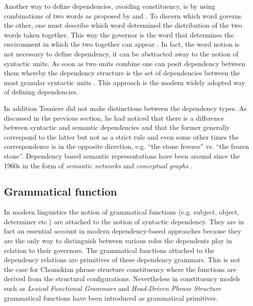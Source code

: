     Another way to define dependencies, avoiding constituency, is by using combinations of two words as proposed by \citet{Garde1977} and \citet{melcuk88}. To discern which word governs the other, one must describe which word determined the distribution of the two words taken together. This way the governor is the word that determines the environment in which the two together can appear \citep[lxi]{Tesniere2015}. In fact, the word notion is not necessary to define dependency, it can be abstracted away to the notion of syntactic units. As soon as two units combine one can posit dependency between them whereby the dependency structure is the set of dependencies between the most granular syntactic units \citep{gerdes2013defining}. This approach is the modern widely adopted way of defining dependencies.

    In addition Tesniere did not make distinctions between the dependency types. As discussed in the previous section, he had noticed that there is a difference between syntactic and semantic dependencies and that the former generally correspond to the latter but not as a strict rule and even some other times the correspondence is in the opposite direction, e.g. ``the stone freezes'' vs. ``the frozen stone''. Dependency based semantic representations have been around since the 1960s in the form of \textit{semantic networks} \citep{ZolkovskijMelcuk67,melcuk88} and \textit{conceptual graphs} \citep{schank1969, Sowa1976}.

\subsection{Grammatical function} 
    In modern linguistics the notion of grammatical functions (e.g. subject, object, determiner etc.) are attached to the notion of syntactic dependency. They are in fact an essential account in modern dependency-based approaches because they are the only way to distinguish between various roles the dependents play in relation to their governors. The grammatical functions attached to the dependency relations are primitives of these dependency grammars. This is not the case for Chomskian phrase structure constituency where the functions are derived from the structural configurations. Nevertheless in constituency models such as \textit{Lexical Functional Grammars} \citep{bresnan2015lexical} and \textit{Head-Driven Phrase Structure} \citep{PollardSag1994} grammatical functions have been introduced as grammatical primitives.

